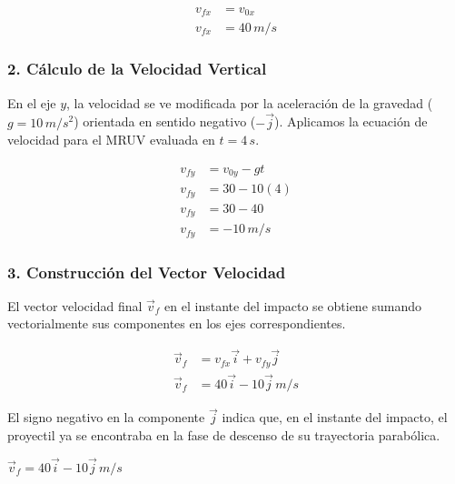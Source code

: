 \documentclass[12pt, a4paper]{article}
\begin{document}
\begin{align*}
v_{fx} &= v_{0x} \\
v_{fx} &= 40 \, \si{m/s}
\end{align*}

\subsubsection*{2. Cálculo de la Velocidad Vertical}
En el eje $y$, la velocidad se ve modificada por la aceleración de la gravedad ($g = 10 \, \si{m/s^2}$) orientada en sentido negativo ($-\vec{j}$). Aplicamos la ecuación de velocidad para el MRUV evaluada en $t = 4 \, \si{s}$.

\begin{align*}
v_{fy} &= v_{0y} - gt \\
v_{fy} &= 30 - 10(4) \\
v_{fy} &= 30 - 40 \\
v_{fy} &= -10 \, \si{m/s}
\end{align*}

\subsubsection*{3. Construcción del Vector Velocidad}
El vector velocidad final $\vec{v}_f$ en el instante del impacto se obtiene sumando vectorialmente sus componentes en los ejes correspondientes.

\begin{align*}
\vec{v}_f &= v_{fx}\vec{i} + v_{fy}\vec{j} \\
\vec{v}_f &= 40\vec{i} - 10\vec{j} \, \si{m/s}
\end{align*}

El signo negativo en la componente $\vec{j}$ indica que, en el instante del impacto, el proyectil ya se encontraba en la fase de descenso de su trayectoria parabólica.

\begin{tcolorbox}[colback=green!5!white, colframe=green!50!black, title=Respuesta Final]
\centering \Large $\vec{v}_f = 40\vec{i} - 10\vec{j} \, \si{m/s}$
\end{tcolorbox}

\newpage
\end{document}
